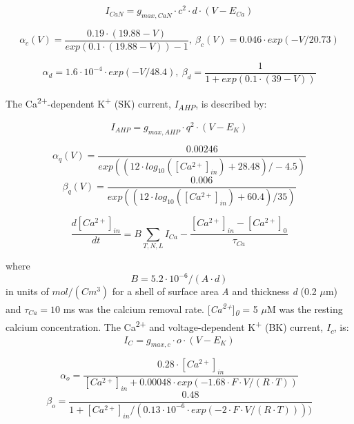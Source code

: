 \documentclass[a4paper,12pt]{article}
\begin{document}
\begin{equation}
I_{CaN}=g_{max, CaN} \cdot c^2 \cdot d \cdot (V-E_{Ca})
\end{equation}

\begin{equation}
\alpha_c(V)=\frac{0.19\cdot(19.88-V)}{ exp(0.1 \cdot(19.88-V))-1}, \  \beta_c(V)=0.046 \cdot exp(-V/20.73)
\end{equation}

\begin{equation}
\alpha_d=1.6\cdot10^{-4}\cdot exp(-V/48.4) , \  \beta_d=\frac 1{1+exp(0.1 \cdot (39-V))}
\end{equation}

The Ca\textsuperscript{2+}-dependent K\textsuperscript{+} (SK) current, \textit{I\textsubscript{AHP}}, is described by:

\begin{equation}
I_{AHP} = g_{max, AHP} \cdot q^2 \cdot (V-E_K)
\end{equation}

\begin{equation}
\alpha_q(V)=\frac{0.00246}{exp((12\cdot log_{10}([Ca^{2+}]_{in})+28.48)/-4.5)}
\end{equation} 
\begin{equation}
\beta_q(V)=\frac{0.006}{exp((12\cdot log_{10}([Ca^{2+}]_{in})+60.4)/35)}
\end{equation}

\begin{equation}
\label{eq:CaDynamics}
\frac{d[Ca^{2+}]_{in}}{dt}=B\sum_{T, N, L}
I_{Ca}-\frac{[Ca^{2+}]_{in}-[Ca^{2+}]_0}{\tau_{Ca}}
\end{equation}

where
\begin{equation}
B = 5.2\cdot 10^{-6}/(A \cdot d)
\end{equation}
in units of $mol/(C m^3)$ for a shell of
surface area \textit{A} and thickness \textit{d} (0.2 $\mu $m) and  $\tau_{Ca}=10$ ms was the calcium removal rate. [\textit{Ca\textsuperscript{2+}}]\textit{\textsubscript{0}} = 5 $\mu$M was the resting calcium concentration. 
The Ca\textsuperscript{2+} and voltage-dependent K\textsuperscript{+} (BK) current, \textit{I\textsubscript{c}}, is:
\begin{equation}
I_C=g_{max, c} \cdot o \cdot (V-E_K)
\end{equation}

\begin{equation}
\alpha_{o} = \frac{0.28 \cdot[Ca^{2+}]_{in}}{[Ca^{2+}]_{in} + 0.00048	\cdot exp(-1.68 \cdot F \cdot V / (R \cdot T)) }
\end{equation}
\begin{equation}
\beta_{o} = \frac{0.48}{1 + [Ca^{2+}]_{in} / (0.13 \cdot 10^{-6} \cdot exp(-2 \cdot F \cdot V/ (R \cdot T))) )}
\end{equation}
\end{document}
